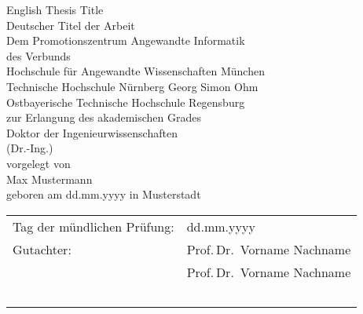 \begin{titlepage}
\centering
\huge

\vspace*{\fill}
English Thesis Title\\[1cm]
Deutscher Titel der Arbeit
\vspace{3cm}\\

\Large
Dem Promotionszentrum Angewandte Informatik\\
des Verbunds\\[1cm]
Hochschule für Angewandte Wissenschaften München\\
Technische Hochschule Nürnberg Georg Simon Ohm\\
Ostbayerische Technische Hochschule Regensburg\\[1cm]

zur Erlangung des akademischen Grades\\
Doktor der Ingenieurwissenschaften\\
(Dr.-Ing.)\\
\vspace{4cm}
vorgelegt von\\
Max Mustermann\\
\vspace{0.5cm}
geboren am dd.mm.yyyy in Musterstadt
\vspace*{\fill}
\end{titlepage}

\newpage
\thispagestyle{empty}


\vspace*{\fill}

\begin{center}
\begin{tabular}{p{6cm}p{8cm}}
Tag der mündlichen Prüfung: & dd.mm.yyyy \\
Gutachter: & Prof.\,Dr.~Vorname Nachname\\
          & Prof.\,Dr.~Vorname Nachname\\
~\\
\end{tabular}
\end{center}
\vspace*{1cm}
